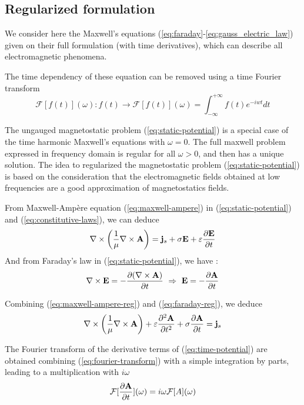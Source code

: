 \subsection{Regularized formulation}
\label{sec:regul-maxwell}
We consider here the Maxwell's equations
(\ref{eq:faraday}-\ref{eq:gauss_electric_law}) given on their full formulation
(with time derivatives), which can describe all electromagnetic phenomena.

The time dependency of these equation can be removed using a time Fourier
transform
\begin{equation}
  \label{eq:fourier-transform}
  \mathcal{F}[f(t)](\omega) : f(t) \longrightarrow \mathcal{F}[f(t)](\omega)
  = \int_{-\infty}^{+\infty} f(t) e^{-iwt} dt
\end{equation}

The ungauged magnetostatic problem (\ref{eq:static-potential}) is a special case
of the time harmonic Maxwell's equations with $\omega = 0$. The full maxwell
problem expressed in frequency domain is regular for all $\omega > 0$, and then
has a unique solution. The idea to regularized the magnetostatic problem
(\ref{eq:static-potential}) is based on the consideration that the
electromagnetic fields obtained at low frequencies are a good approximation of
magnetostatics fields.

From Maxwell-Ampère equation (\ref{eq:maxwell-ampere}) in
(\ref{eq:static-potential}) and (\ref{eq:constitutive-laws}), we can deduce
\begin{equation}
  \label{eq:maxwell-ampere-reg}
  \nabla \times \left( \frac{1}{\mu} \nabla \times \mathbf{A} \right)
  = \mathbf{j}_s + \sigma \mathbf{E} + \varepsilon \frac{\partial \mathbf{E}}{\partial t}
\end{equation}
And from Faraday's law in (\ref{eq:static-potential}), we have :
\begin{equation}
  \label{eq:faraday-reg}
  \nabla \times \mathbf{E} = -\frac{\partial (\nabla \times \mathbf{A}) }{\partial t}
  ~\Rightarrow ~\mathbf{E} = -\frac{\partial \mathbf{A}}{\partial t}
\end{equation}

Combining (\ref{eq:maxwell-ampere-reg}) and (\ref{eq:faraday-reg}), we deduce
\begin{equation}
  \label{eq:time-potential}
  \nabla \times \left( \frac{1}{\mu} \nabla \times \mathbf{A} \right)
  + \varepsilon \frac{\partial^2 \mathbf{A}}{\partial t^2}
  + \sigma \frac{\partial \mathbf{A}}{\partial t}
  = \mathbf{j}_s
\end{equation}

The Fourier transform of the derivative terms of (\ref{eq:time-potential}) are
obtained combining (\ref{eq:fourier-transform}) with a simple integration by
parts, leading to a multiplication with $i \omega$
\begin{equation*}
  \mathcal{F}[\frac{\partial \mathbf{A}}{\partial t}](\omega)
  = i \omega \mathcal{F}[A](\omega)
\end{equation*}

